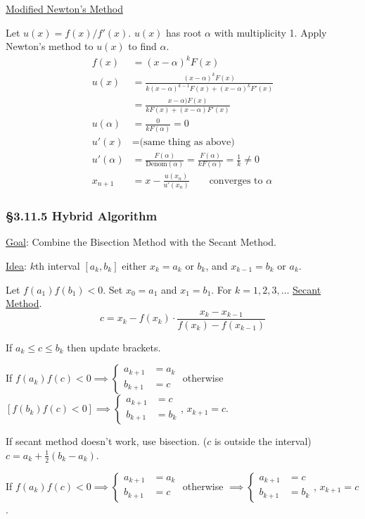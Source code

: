 \documentclass[]{article}
\begin{document}
\ul{Modified Newton's Method}

Let $u(x) = f(x)/f'(x)$.
$u(x)$ has root $\alpha$ with multiplicity 1.
Apply Newton's method to $u(x)$ to find $\alpha$.
\begin{align*}
	f(x) &= (x-\alpha)^k F(x) \\
	u(x) &= \frac{(x-\alpha)^k F(x)}{k(x-\alpha)^{k-1}F(x) + (x-\alpha)^kF'(x)} \\
		 &= \frac{x-\alpha)F(x)}{kF(x) + (x-\alpha)F'(x)} \\
	u(\alpha) &= \frac0{kF(\alpha)} = 0 \\
	u'(x) &= \text{(same thing as above)} \\
	u'(\alpha) &= \frac{F(\alpha)}{\text{Denom}(\alpha)} = \frac{F(\alpha)}{kF(\alpha)} = \frac1k \neq0 \\
	x_{n+1} &= x-\frac{u(x_n)}{u'(x_n)} \qquad \text{converges to }\alpha
\end{align*}

\subsubsection*{\S3.11.5 Hybrid Algorithm}

\ul{Goal}: Combine the Bisection Method with the Secant Method.

\ul{Idea}: $k$th interval $[a_k,b_k]$ either $x_k=a_k$ or $b_k$, and $x_{k-1} = b_k$ or $a_k$.

Let $f(a_1)f(b_1)<0$. Set $x_0=a_1$ and $x_1=b_1$.
For $k=1,2,3,\dots$ \ul{Secant Method}.
$$ c = x_k - f(x_k)\cdot\frac{x_k-x_{k-1}}{f(x_k)-f(x_{k-1})} $$

If $a_k\leq c\leq b_k$ then update brackets.

If $f(a_k)f(c)<0 \implies \begin{cases} a_{k+1} &= a_k \\ b_{k+1} &=c \end{cases}$ otherwise $[f(b_k)f(c)<0] \implies \begin{cases} a_{k+1} &= c \\ b_{k+1} &= b_k \end{cases}$, $x_{k+1}=c$.

If secant method doesn't work, use bisection.
($c$ is outside the interval) $c = a_k+\frac12(b_k-a_k)$.

If $f(a_k)f(c) < 0 \implies \begin{cases} a_{k+1} &= a_k \\ b_{k+1} &= c \end{cases}$ otherwise $\implies \begin{cases} a_{k+1} &= c \\ b_{k+1} &= b_k \end{cases}$, $x_{k+1}=c$.
\end{document}
